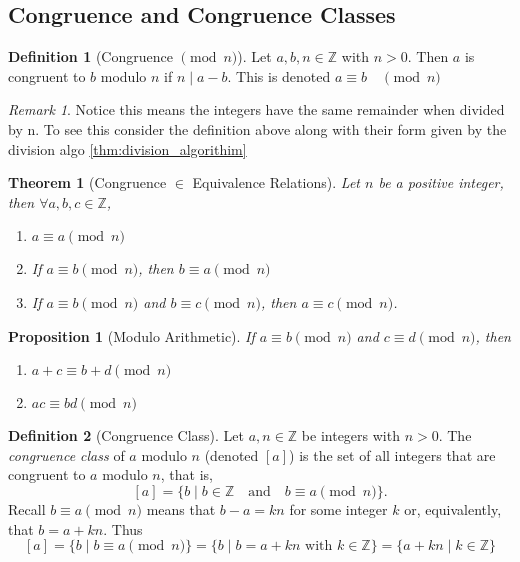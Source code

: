 \documentclass{article}
\newtheorem{theorem}{Theorem}[section]
\newtheorem{proposition}{Proposition}[section]
\theoremstyle{definition}
\newtheorem{definition}{Definition}[section]
\theoremstyle{remark}
\newtheorem{remark}{Remark}[section]
\begin{document}
\subsection{Congruence and Congruence Classes}







\begin{definition}[Congruence $\pmod{n}$]
Let $a,b,n \in \mathbb{Z}$ with $n>0$. Then $a$ is congruent to $b$ modulo $n$ if $n \mid a-b$. This is denoted $ a \equiv b \quad \pmod{n}$

\end{definition}

\begin{remark}
Notice this means the integers have the same remainder when divided by n. To see this
consider the definition above along with their form given by the division algo \ref{thm:division_algorithim}
\end{remark}

\begin{theorem}[Congruence $\in$ Equivalence Relations]
Let $n$ be a positive integer, then $\forall a,b,c \in \mathbb{Z}$,
\begin{enumerate}
\item $ a \equiv a \pmod{n}$
\item If $ a \equiv b  \pmod{n}$, then $ b \equiv a \pmod{n}$
\item If $ a \equiv b \pmod{n}$ and $ b \equiv c \pmod{n}$, then $ a \equiv c \pmod{n}$.
\end{enumerate}

\end{theorem}





\begin{proposition}[Modulo Arithmetic]\label{prp:mod_arithmetic}
If $ a \equiv b \pmod{n}$ and $ c \equiv d \pmod{n}$, then 
\begin{enumerate}
\item $ a+c \equiv b+d \pmod{n}$
\item $ ac \equiv bd \pmod{n}$
\end{enumerate}
\end{proposition}





\begin{definition}[Congruence Class]
Let $a, n \in \mathbb{Z}$ be integers with $n > 0$. The \textit{congruence class} of $a$ modulo $n$ (denoted $[a]$) is the set of all integers that are congruent to $a$ modulo $n$, that is,
\[
[a] = \{b \mid b \in \mathbb{Z} \quad \text{and} \quad b \equiv a \pmod{n} \}.
\]
Recall $b \equiv a \pmod{n}$ means that $b - a = kn$ for some integer $k$ or, equivalently, that $b = a + kn$. Thus
\[
[a] = \{b \mid b \equiv a \pmod{n} \} = \{b \mid b = a + kn \text{ with } k \in \mathbb{Z} \} = \{a + kn \mid k \in \mathbb{Z} \}
\]
\end{definition}
\end{document}
